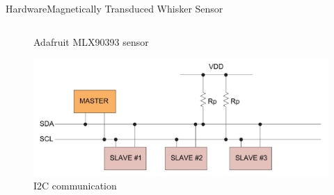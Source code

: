 \documentclass[AIRbeamer
,optEnglish
,optBiber
,optBibstyleAlphabetic
,optBeamerClassicFormat%
]{AIRlatex}
\begin{document}
\begin{frame}{Hardware}{Magnetically Transduced Whisker Sensor}
\begin{columns}[T,onlytextwidth]
\begin{column}[T]{0.6\textwidth}
\begin{figure}[H]
                    \caption{Adafruit MLX90393 sensor}
                \end{figure}
                \vskip-0.5cm
                \begin{figure}[H]
                    \centering
                    \includegraphics[height=0.3\textheight]{figures/i2c}
                    \caption{I2C communication}
                \end{figure}
            \end{column}
        \end{columns}
    \end{frame}
\end{document}
